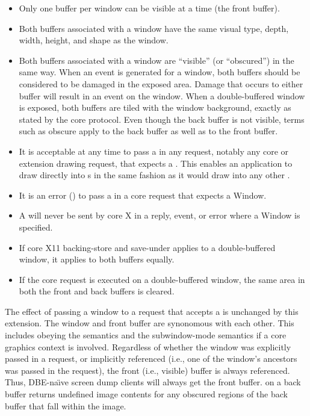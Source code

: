 \begin{itemize}

\item Only one buffer per window can be visible at a time (the
front buffer).

\item Both buffers associated with a window have the same visual type,
depth, width, height, and shape as the window.

\item Both buffers associated with a window are ``visible'' (or
``obscured'') in the same way.  When an  event is
generated for
a window, both buffers should be considered to be damaged in the
exposed area.  Damage that occurs to either buffer will result in an
 event on the window.  When a double-buffered window is
exposed,
both buffers are tiled with the window background, exactly as stated
by the core protocol.  Even though the back buffer is not visible,
terms such as obscure apply to the back buffer as well as to the front
buffer.

\item It is acceptable at any time to pass a  in
any request, notably any core or extension drawing request, that
expects a .  This enables an application to draw
directly into s in the same fashion as it would
draw into any other .

\item It is an error () to pass a  in a
core request that expects a Window.

\item A  will never be sent by core X in a reply,
event, or error where a Window is specified.
\item If core X11 backing-store and save-under applies to a
double-buffered window, it applies to both buffers equally.

\item If the core  request is executed on a
double-buffered window, the same area in both the front and back
buffers is cleared.

\end{itemize}

The effect of passing a window to a request that accepts a
 is unchanged by this extension.  The window and
front buffer are synonomous with each other.  This includes obeying
the  semantics and the subwindow-mode semantics
if a core graphics context is involved.  Regardless of whether the
window was explicitly passed in a  request, or
implicitly referenced (i.e., one of the window's ancestors was passed
in the request), the front (i.e., visible) buffer is always referenced.
Thus, DBE-na\"{\i}ve screen dump clients will always get the front buffer.
 on a back buffer returns undefined image
contents for any obscured regions of the back buffer that fall within
the image.

